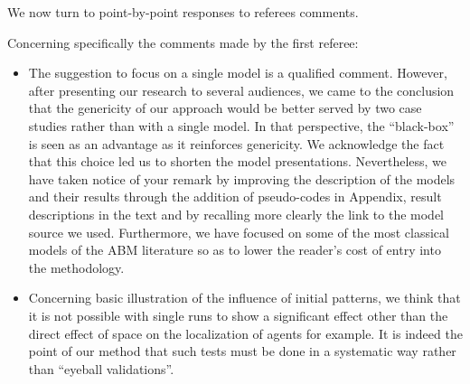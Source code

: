 \documentclass[11pt,a4paper,sans]{moderncv}        %
\begin{document}
\medskip



We now turn to point-by-point responses to referees comments.


\medskip


Concerning specifically the comments made by the first referee:

\begin{itemize}
	\item The suggestion to focus on a single model is a qualified comment. However, after presenting our research to several audiences, we came to the conclusion that the genericity of our approach would be better served by two case studies rather than with a single model. In that perspective, the ``black-box'' is seen as an advantage as it reinforces genericity. We acknowledge the fact that this choice led us to shorten the model presentations. Nevertheless, we have taken notice of your remark by improving the description of the models and their results through the addition of pseudo-codes in Appendix, result descriptions in the text and by recalling more clearly the link to the model source we used. Furthermore, we have focused on some of the most classical models of the ABM literature so as to lower the reader's cost of entry into the methodology.
   
   \item Concerning basic illustration of the influence of initial patterns, we think that it is not possible with single runs to show a significant effect other than the direct effect of space on the localization of agents for example. It is indeed the point of our method that such tests must be done in a systematic way rather than ``eyeball validations''.
	

\end{itemize}
\end{document}
